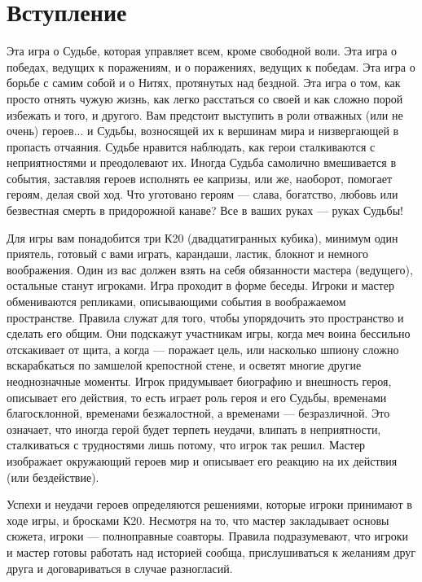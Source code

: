 \chapter*{Вступление}
Эта игра о Судьбе, которая управляет всем, кроме свободной воли. Эта игра о победах, ведущих к поражениям, и о поражениях, ведущих к победам. Эта игра о борьбе с самим собой и о Нитях, протянутых над бездной. Эта игра о том, как просто отнять чужую жизнь, как легко расстаться со своей и как сложно порой избежать и того, и другого.
Вам предстоит выступить в роли отважных (или не очень) героев... и Судьбы, возносящей их к вершинам мира и низвергающей в пропасть отчаяния. Судьбе нравится наблюдать, как герои сталкиваются с неприятностями и преодолевают их. Иногда Судьба самолично вмешивается в события, заставляя героев исполнять ее капризы, или же, наоборот, помогает героям, делая свой ход. Что уготовано героям — слава, богатство, любовь или безвестная смерть в придорожной канаве? Все в ваших руках — руках Судьбы!

Для игры вам понадобится три К20 (двадцатигранных кубика), минимум один приятель, готовый с вами играть, карандаши, ластик, блокнот и немного воображения. Один из вас должен взять на себя обязанности мастера (ведущего), остальные станут игроками. Игра проходит в форме беседы. Игроки и мастер обмениваются репликами, описывающими события в воображаемом пространстве. Правила служат для того, чтобы упорядочить это пространство и сделать его общим. Они подскажут участникам игры, когда меч воина бессильно отскакивает от щита, а когда — поражает цель, или насколько шпиону сложно вскарабкаться по замшелой крепостной стене, и осветят многие другие неоднозначные моменты. Игрок придумывает биографию и внешность героя, описывает его действия, то есть играет роль героя и его Судьбы, временами благосклонной, временами безжалостной, а временами — безразличной. Это означает, что иногда герой будет терпеть неудачи, влипать в неприятности, сталкиваться с трудностями лишь потому, что игрок так решил. Мастер изображает окружающий героев мир и описывает его реакцию на их действия (или бездействие).

Успехи и неудачи героев определяются решениями, которые игроки принимают в ходе игры, и бросками К20. Несмотря на то, что мастер закладывает основы сюжета, игроки — полноправные соавторы. Правила подразумевают, что игроки и мастер готовы работать над историей сообща, прислушиваться к желаниям друг друга и договариваться в случае разногласий.




